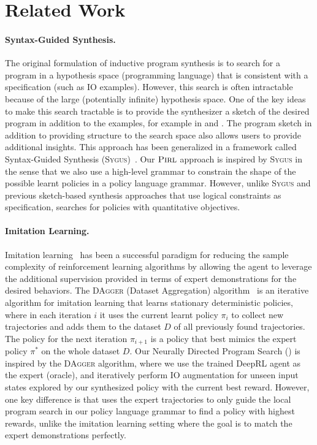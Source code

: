 \section{Related Work}
\label{sec:related}

\paragraph{Syntax-Guided Synthesis.} 
The original formulation of inductive program synthesis is to search for a program in a hypothesis space (programming language) that is consistent with a specification (such as IO examples). However, this search is often intractable because of the large (potentially infinite) hypothesis space. One of the key ideas to make this search tractable is to provide the synthesizer a sketch of the desired program in addition to the examples, for example in \cite{Sketch:Main} and \cite{DBLP:conf/pldi/FeserCD15}. The program sketch in addition to providing structure to the search space also allows users to provide additional insights. This approach has been generalized in a framework called Syntax-Guided Synthesis (\textsc{Sygus})~\cite{sygus}. Our $\textsc{Pirl}$ approach is inspired by \textsc{Sygus} in the sense that we also use a high-level grammar to constrain the shape of the possible learnt policies in a policy language grammar. However, unlike \textsc{Sygus} and previous sketch-based synthesis approaches that use logical constraints as specification, \sygurl searches for policies with quantitative objectives.
\paragraph{Imitation Learning.} Imitation learning~\cite{schaal1999imitation} has been a successful paradigm for reducing the sample complexity of reinforcement learning algorithms by allowing the agent to leverage the additional supervision provided in terms of expert demonstrations for the desired behaviors. The \textsc{DAgger} (Dataset Aggregation) algorithm~\cite{dagger} is an iterative algorithm for imitation learning that learns stationary deterministic policies, where in each iteration $i$ it uses the current learnt policy $\pi_i$ to collect new trajectories and adds them to the dataset $D$ of all previously found trajectories. The policy for the next iteration $\pi_{i+1}$ is a policy that best mimics the expert policy $\pi^*$ on the whole dataset $D$. Our Neurally Directed Program Search (\algo) is inspired by the \textsc{DAgger} algorithm, where we use the trained DeepRL agent as the expert (oracle), and iteratively perform IO augmentation for unseen input states explored by our synthesized policy with the current best reward. However, one key difference is that \algo uses the expert trajectories to only guide the local program search in our policy language grammar to find a policy with highest rewards, unlike the imitation learning setting where the goal is to match the expert demonstrations perfectly.

